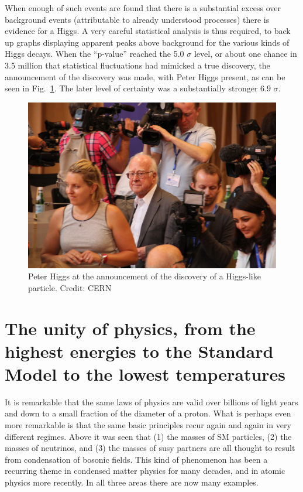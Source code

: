 \documentclass[12pt]{iopart}
\begin{document}
When enough of such events are found that there is a substantial excess over background events (attributable to already understood processes) there is evidence for a Higgs. A very careful statistical analysis is thus required, to back up graphs displaying apparent peaks above background for the various kinds of Higgs decays. When the ``p-value'' reached the 5.0 $\sigma$ level, or about one chance in 3.5 million that statistical fluctuations had mimicked a true discovery, the announcement of the discovery was made, with Peter Higgs present, as can be seen in Fig.~\ref{Fig23-Peter-Higgs.eps}. The later level of certainty was a substantially stronger 6.9 $\sigma$.
\begin{figure}[htbp]
\centering
\includegraphics[bb=0 0 360 270, width=5in]{Fig23-Peter-Higgs.eps}
\caption{Peter Higgs at the announcement of the discovery of a Higgs-like particle. Credit: CERN \label{Fig23-Peter-Higgs.eps}}
\end{figure}

\section{\label{sec:sec5a} The unity of physics, from the highest energies to the Standard Model to the lowest temperatures}

It is remarkable that the same laws of physics are valid over billions of light years and down to a small fraction of the diameter of a proton. What is perhaps even more remarkable is that the same basic principles recur again and again in very different regimes. Above it was seen that (1) the masses of SM particles, (2) the masses of neutrinos, and (3) the masses of susy partners are all thought to result from condensation of bosonic fields. This kind of phenomenon has been a recurring theme in condensed matter physics for many decades, and in atomic physics more recently. In all three areas there are now many examples. 
\end{document}

